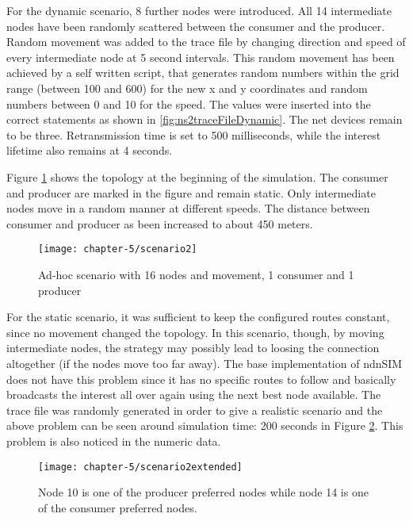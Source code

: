 For the dynamic scenario, 8 further nodes were introduced. All 14 intermediate nodes have been randomly scattered between the consumer and the producer. Random movement was added to the trace file by changing direction and speed of every intermediate node at 5 second intervals. This random movement has been achieved by a self written script, that generates random numbers within the grid range (between 100 and 600) for the new x and y coordinates and random numbers between 0 and 10 for the speed. The values were inserted into the correct statements as shown in \ref{fig:ns2traceFileDynamic}. The net devices remain to be three. Retransmission time is set to 500 milliseconds, while the interest lifetime also remains at 4 seconds. 

Figure \ref{fig:scenario2} shows the topology at the beginning of the simulation. The consumer and producer are marked in the figure and remain static. Only intermediate nodes move in a random manner at different speeds. The distance between consumer and producer as been increased to about 450 meters.

\vspace{5mm} %

\begin{figure}[H]
  \centering
  \texttt{[image: chapter-5/scenario2]}
  \caption{Ad-hoc scenario with 16 nodes and movement, 1 consumer and 1 producer}
  \label{fig:scenario2}
\end{figure}

\vspace{5mm} %

For the static scenario, it was sufficient to keep the configured routes constant, since no movement changed the topology. In this scenario, though, by moving intermediate nodes, the strategy may possibly lead to loosing the connection altogether (if the nodes move too far away). The base implementation of ndnSIM does not have this problem since it has no specific routes to follow and basically broadcasts the interest all over again using the next best node available. The trace file was randomly generated in order to give a realistic scenario and the above problem can be seen around simulation time: 200 seconds in Figure \ref{fig:scenario2extended}. This problem is also noticed in the numeric data.

\begin{figure}[H]
  \centering
  \texttt{[image: chapter-5/scenario2extended]}
  \caption{Node 10 is one of the producer preferred nodes while node 14 is one of the consumer preferred nodes.}
  \label{fig:scenario2extended}
\end{figure}

